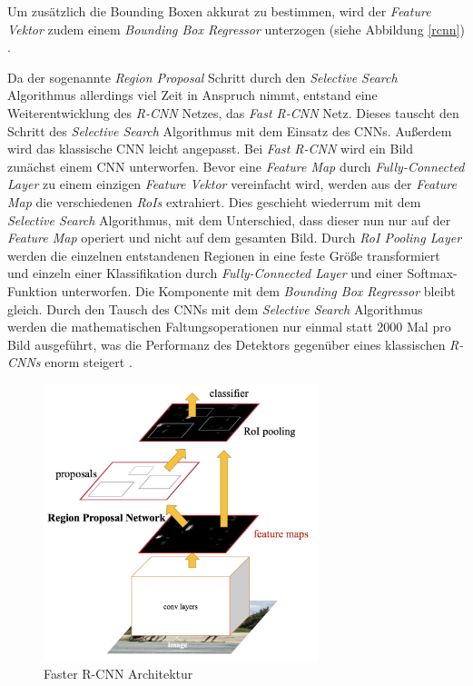 \newpage

Um zusätzlich die Bounding Boxen akkurat zu bestimmen, wird der \textit{Feature Vektor} zudem einem \textit{Bounding Box Regressor} unterzogen (siehe Abbildung \ref{rcnn}) \cite{RossGirshickJeffDonahueTrevorDarrellJitendraMalik.2016}. 

Da der sogenannte \textit{Region Proposal} Schritt durch den \textit{Selective Search} Algorithmus allerdings viel Zeit in Anspruch nimmt, entstand eine Weiterentwicklung des \textit{R-CNN } Netzes, das \textit{Fast R-CNN} Netz. Dieses tauscht den Schritt des \textit{Selective Search} Algorithmus mit dem Einsatz des CNNs. Außerdem wird das klassische CNN leicht angepasst. Bei \textit{Fast R-CNN} wird ein Bild zunächst einem CNN unterworfen. Bevor eine \textit{Feature Map} durch \textit{Fully-Connected Layer} zu einem einzigen \textit{Feature Vektor} vereinfacht wird, werden aus der \textit{Feature Map} die verschiedenen \textit{RoIs} extrahiert. Dies geschieht wiederrum mit dem \textit{Selective Search} Algorithmus, mit dem Unterschied, dass dieser nun nur auf der \textit{Feature Map} operiert und nicht auf dem gesamten Bild. Durch \textit{RoI Pooling Layer} werden die einzelnen entstandenen Regionen in eine feste Größe transformiert und einzeln einer Klassifikation durch \textit{Fully-Connected Layer} und einer Softmax-Funktion unterworfen. Die Komponente mit dem \textit{Bounding Box Regressor} bleibt gleich. Durch den Tausch des CNNs mit dem \textit{Selective Search} Algorithmus werden die mathematischen Faltungsoperationen nur einmal statt 2000 Mal pro Bild ausgeführt, was die Performanz des Detektors gegenüber eines klassischen \textit{R-CNNs} enorm steigert \cite{RossGirshick.2015}.

\begin{figure}[H]
	\begin{center}
		\includegraphics[width=8cm]{Bilder/fasterrcnn.png} 
		\caption[Faster R-CNN Architektur]{Faster R-CNN Architektur \cite{RohithGandhi.20180709}}
		\label{fasterrcnn}
	\end{center}
\end{figure}

